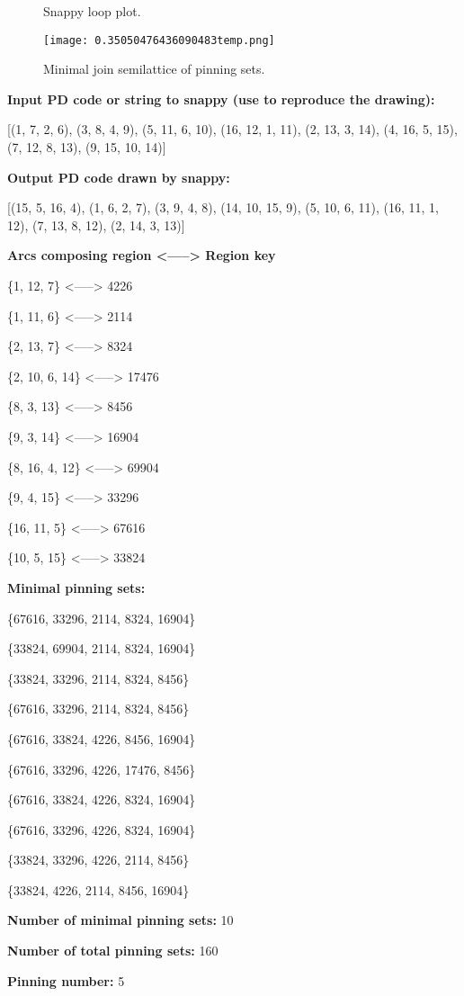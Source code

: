 \documentclass{article}%
\begin{document}
\begin{multicols}{2}
\begin{figure}[H]
\centering

\caption{Snappy loop plot.}
\label{fig:0.77063901738011temp.svg}
\end{figure}\columnbreak

\begin{figure}[H]
\centering
\texttt{[image: 0.35050476436090483temp.png]}
\caption{Minimal join semilattice of pinning sets.}
\label{fig:0.35050476436090483temp.png}
\end{figure}\end{multicols}\newpage\begin{multicols}{2}
\textbf{Input PD code or string to snappy (use to reproduce the drawing):}

	[(1, 7, 2, 6), (3, 8, 4, 9), (5, 11, 6, 10), (16, 12, 1, 11), (2, 13, 3, 14), (4, 16, 5, 15), (7, 12, 8, 13), (9, 15, 10, 14)]

\textbf{Output PD code drawn by snappy:}

	[(15, 5, 16, 4), (1, 6, 2, 7), (3, 9, 4, 8), (14, 10, 15, 9), (5, 10, 6, 11), (16, 11, 1, 12), (7, 13, 8, 12), (2, 14, 3, 13)]


\textbf{Arcs composing region <-----> Region key}

\{{1, 12, 7}\} <-----> 4226

\{{1, 11, 6}\} <-----> 2114

\{{2, 13, 7}\} <-----> 8324

\{{2, 10, 6, 14}\} <-----> 17476

\{{8, 3, 13}\} <-----> 8456

\{{9, 3, 14}\} <-----> 16904

\{{8, 16, 4, 12}\} <-----> 69904

\{{9, 4, 15}\} <-----> 33296

\{{16, 11, 5}\} <-----> 67616

\{{10, 5, 15}\} <-----> 33824


\columnbreak

\textbf{Minimal pinning sets:}

\{{67616, 33296, 2114, 8324, 16904}\}

\{{33824, 69904, 2114, 8324, 16904}\}

\{{33824, 33296, 2114, 8324, 8456}\}

\{{67616, 33296, 2114, 8324, 8456}\}

\{{67616, 33824, 4226, 8456, 16904}\}

\{{67616, 33296, 4226, 17476, 8456}\}

\{{67616, 33824, 4226, 8324, 16904}\}

\{{67616, 33296, 4226, 8324, 16904}\}

\{{33824, 33296, 4226, 2114, 8456}\}

\{{33824, 4226, 2114, 8456, 16904}\}



\textbf{Number of minimal pinning sets:} 10

\textbf{Number of total pinning sets:} 160

\textbf{Pinning number:} 5


\end{multicols}
\end{document}
